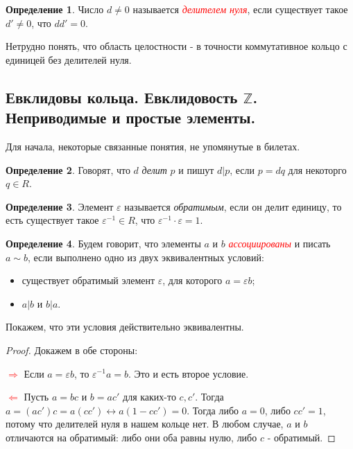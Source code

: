 \documentclass[a4paper,100pt]{article}
\theoremstyle{indented}
\theoremstyle{definition}
\newtheorem{defn}{Определение}
\theoremstyle{remark}
\begin{document}
\begin{defn}
    Число $d\neq 0$ называется \hypertarget{n3}{\textcolor{red}{\textit{делителем нуля}}}, если существует такое $d'\neq 0$, что $dd'=0$.
\end{defn}

Нетрудно понять, что область целостности - в точности коммутативное кольцо с единицей без делителей нуля.

\resetall

\subsection{Евклидовы кольца. Евклидовость $\mathbb{Z}$. Неприводимые и простые элементы.}

\medskip

Для начала, некоторые связанные понятия, не упомянутые в билетах.

\begin{defn}
    Говорят, что $d$ \textit{делит} $p$ и пишут $d|p$, если $p=dq$ для некоторго $q\in R$.
\end{defn}

\begin{defn}
    Элемент $\varepsilon$ называется \textit{обратимым}, если он делит единицу, то есть существует такое $\varepsilon^{-1} \in R$, что $\varepsilon^{-1} \cdot \varepsilon = 1$. 
\end{defn}

\begin{defn}
    Будем говорит, что элементы $a$ и $b$ \hypertarget{n4}{\textcolor{red}{\textit{ассоциированы}}} и писать $a\sim b$, если выполнено одно из двух эквивалентных условий:
    \begin{itemize}
        \item существует обратимый элемент $\varepsilon$, для которого $a=\varepsilon b$;
        \item $a|b$ и $b|a$.
    \end{itemize}
\end{defn}

Покажем, что эти условия действительно эквивалентны.

\begin{proof}
    Докажем в обе стороны:\

    \textcolor{red}{$\Rightarrow$} Если $a=\varepsilon b$, то $\varepsilon^{-1}a=b$. Это и есть второе условие.\

    \textcolor{red}{$\Leftarrow$} Пусть $a=bc$ и $b=ac'$ для каких-то $c, c'$. Тогда $a = (ac')c=a(cc')\leftrightarrow a(1-cc')=0$. Тогда либо $a=0$, либо $cc'=1$, потому что делителей нуля в нашем кольце нет. В любом случае, $a$ и $b$ отличаются на обратимый: либо они оба равны нулю, либо $c$ - обратимый.
\end{proof}
\end{document}
